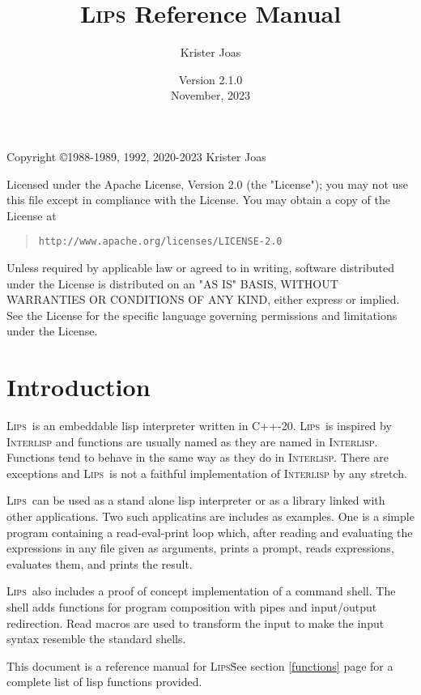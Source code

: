 \documentclass[a4paper]{article}
\title{\textsc{Lips} Reference Manual}
\author{Krister Joas}
\date{Version 2.1.0\\November, 2023}
\newcommand{\lips}{\textsc{Lips}}
\begin{document}
\maketitle

\newpage

Copyright \copyright 1988-1989, 1992, 2020-2023 Krister Joas

Licensed under the Apache License, Version 2.0 (the "License"); you
may not use this file except in compliance with the License.  You may
obtain a copy of the License at

\begin{quotation}
\texttt{http://www.apache.org/licenses/LICENSE-2.0}
\end{quotation}

Unless required by applicable law or agreed to in writing, software
distributed under the License is distributed on an "AS IS" BASIS,
WITHOUT WARRANTIES OR CONDITIONS OF ANY KIND, either express or
implied.  See the License for the specific language governing
permissions and limitations under the License.

\newpage

\section{Introduction}

\lips\ is an embeddable lisp interpreter written in \textsf{C++-20}.
\lips\ is inspired by \textsc{Interlisp} and functions are usually
named as they are named in \textsc{Interlisp}.  Functions tend to
behave in the same way as they do in \textsc{Interlisp}.  There are
exceptions and \lips\ is not a faithful implementation of
\textsc{Interlisp} by any stretch.

\lips\ can be used as a stand alone lisp interpreter or as a library
linked with other applications.  Two such applicatins are includes as
examples.  One is a simple program containing a read-eval-print loop
which, after reading and evaluating the expressions in any file given
as arguments, prints a prompt, reads expressions, evaluates them, and
prints the result.

\lips\ also includes a proof of concept implementation of a command
shell.  The shell adds functions for program composition with pipes
and input/output redirection.  Read macros are used to transform the
input to make the input syntax resemble the standard shells.

This document is a reference manual for \lips\.  See section
\ref{functions} page \pageref{functions} for a complete list of lisp
functions provided.
\end{document}
